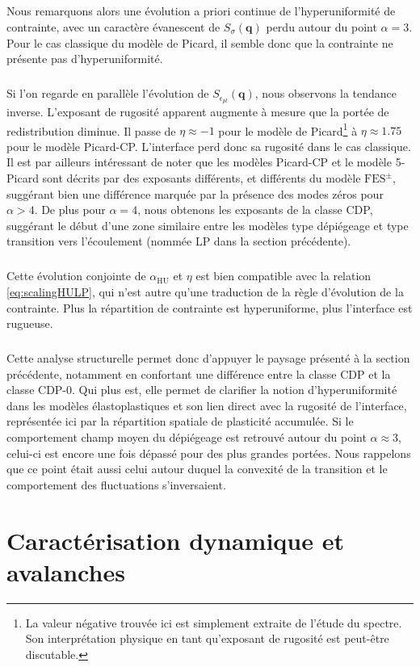 \subparagraph{}Nous remarquons alors une évolution a priori continue de l'hyperuniformité de contrainte, avec un caractère évanescent de $S_\sigma(\mathbf{q})$ perdu autour du point $\alpha=3$. Pour le cas classique du modèle de Picard, il semble donc que la contrainte ne présente pas d'hyperuniformité.

\subparagraph{}Si l'on regarde en parallèle l'évolution de $S_{\epsilon_{pl}}(\mathbf{q})$, nous observons la tendance inverse. L'exposant de rugosité apparent augmente à mesure que la portée de redistribution diminue. Il passe de $\eta\approx -1$ pour le modèle de Picard\footnote{La valeur négative trouvée ici est simplement extraite de l'étude du spectre. Son interprétation physique en tant qu'exposant de rugosité est peut-être discutable.} à $\eta\approx 1.75$ pour le modèle Picard-CP. L'interface perd donc sa rugosité dans le cas classique. Il est par ailleurs intéressant de noter que les modèles Picard-CP et le modèle 5-Picard sont décrits par des exposants différents, et différents du modèle $\text{FES}^\pm$, suggérant bien une différence marquée par la présence des modes zéros pour $\alpha>4$. De plus pour $\alpha=4$, nous obtenons les exposants de la classe CDP, suggérant le début d'une zone similaire entre les modèles type dépiégeage et type transition vers l'écoulement (nommée LP dans la section précédente).

\subparagraph{}Cette évolution conjointe de $\alpha_\text{HU}$ et $\eta$ est bien compatible avec la relation \autoref{eq:scalingHULP}, qui n'est autre qu'une traduction de la règle d'évolution de la contrainte. Plus la répartition de contrainte est hyperuniforme, plus l'interface est rugueuse.

\subparagraph{}Cette analyse structurelle permet donc d'appuyer le paysage présenté à la section précédente, notamment en confortant une différence entre la classe CDP et la classe CDP-0. Qui plus est, elle permet de clarifier la notion d'hyperuniformité dans les modèles élastoplastiques et son lien direct avec la rugosité de l'interface, représentée ici par la répartition spatiale de plasticité accumulée. Si le comportement champ moyen du dépiégeage est retrouvé autour du point $\alpha \approx 3$, celui-ci est encore une fois dépassé pour des plus grandes portées. Nous rappelons que ce point était aussi celui autour duquel la convexité de la transition et le comportement des fluctuations s'inversaient.

\section{Caractérisation dynamique et avalanches}

